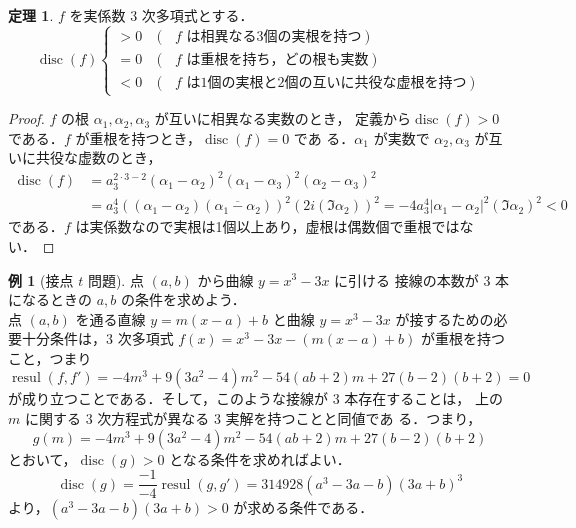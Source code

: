 \documentclass[12pt, uplatex, dvipdfmx]{jsarticle}
\theoremstyle{definition}
\newtheorem{theorem}{定理}
\newtheorem{example}{例}
\DeclareMathOperator{\resul}{resul}
\DeclareMathOperator{\disc}{disc}
\begin{document}
\begin{theorem}
  $f$ を実係数 $3$ 次多項式とする．
  \[
    \disc (f) 
    \begin{cases}
      >0 & (\text{ $f$ は相異なる3個の実根を持つ})\\
      =0 & (\text{ $f$ は重根を持ち，どの根も実数})\\
      <0 & (\text{ $f$ は1個の実根と2個の互いに共役な虚根を持つ})
    \end{cases}
  \]
\end{theorem}

\begin{proof}
  $f$ の根 $\alpha_1, \alpha_2, \alpha_3$ が互いに相異なる実数のとき，
  定義から$\disc(f) >0$ である．$f$ が重根を持つとき，$\disc(f)=0$ であ
  る．$\alpha_1$ が実数で $\alpha_2, \alpha_3$ が互いに共役な虚数のとき，
  \[
    \begin{aligned}
      \disc(f) &= a_3^{2\cdot 3-2} (\alpha_1-\alpha_2)^2(\alpha_1-\alpha_3)^2(\alpha_2-\alpha_3)^2\\
      &=a_3^{4}\left( \left( \alpha_1 - \alpha_2\right)\left(\overline{\alpha_1-\alpha_2}\right)\right)^2
      \left( 2 i \left(\Im \alpha_2\right)\right)^2
      = -4 a_3^{4} \left| \alpha_1-\alpha_2\right|^2 \left( \Im \alpha_2\right)^2 <0
    \end{aligned}
  \]
  である．$f$ は実係数なので実根は1個以上あり，虚根は偶数個で重根ではない．
\end{proof}


\begin{example}[接点 $t$ 問題] 点 $(a,b)$ から曲線 $y=x^3-3x$ に引ける
  接線の本数が $3$ 本になるときの $a,b$ の条件を求めよう．\\

  点 $(a,b)$ を通る直線 $y=m(x-a)+b$ と曲線 $y=x^3-3x$ が接するための必
  要十分条件は，$3$ 次多項式 $f(x) = x^3-3x - \left( m(x-a)+b\right)$
  が重根を持つこと，つまり
  \[
    \resul(f, f') = -4 m^{3}+9 \left(3 a^{2}-4\right) m^{2}-54 \left(a
      b +2\right) m +27 \left(b -2\right) \left(b +2\right)=0
  \]
  が成り立つことである．そして，このような接線が $3$ 本存在することは，
  上の $m$ に関する $3$ 次方程式が異なる $3$ 実解を持つことと同値であ
  る．つまり，
  \[
    g(m) = -4 m^{3}+9 \left(3 a^{2}-4\right) m^{2}-54 \left(a
      b +2\right) m +27 \left(b -2\right) \left(b +2\right)
  \]
  とおいて，$\disc(g)>0$ となる条件を求めればよい．
  \[
    \disc(g) = \frac{-1}{-4}\resul(g,g') = 314928 (a^3-3a-b)(3a+b)^3
  \]
  より，$(a^3-3a-b)(3a+b)>0$ が求める条件である．
\end{example}
\end{document}
